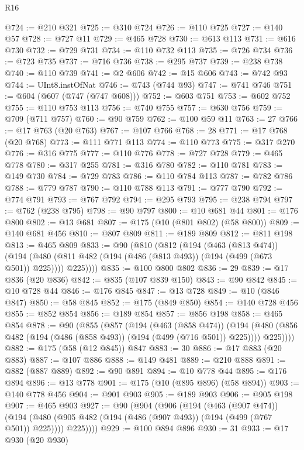 \begin{lexlean}{R16}
\begin{coremodule}
@724 := @210 @321
@725 := @310 @724
@726 := @110 @725
@727 := @140 @57
@728 := @727 @11
@729 := @465 @728
@730 := @613 @113
@731 := @616 @730
@732 := @729 @731
@734 := @110 @732 @113
@735 := @726 @734
@736 := @723 @735
@737 := @716 @736
@738 := @295 @737
@739 := @238 @738
@740 := @110 @739
@741 := @2 @606
@742 := @15 @606
@743 := @742 @93
@744 := UInt8.instOfNat
@746 := @743 (@744 @93)
@747 := @741 @746
@751 := @604 (@607 (@747 (@747 @608)))
@752 := @603 @751
@753 := @602 @752
@755 := @110 @753 @113
@756 := @740 @755
@757 := @630 @756
@759 := @709 (@711 @757)
@760 := @90 @759
@762 := @100 @59 @11
@763 := 27
@766 := @17 @763 (@20 @763)
@767 := @107 @766
@768 := 28
@771 := @17 @768 (@20 @768)
@773 := @111 @771 @113
@774 := @110 @773
@775 := @317 @270
@776 := @316 @775
@777 := @110 @776
@778 := @727 @728
@779 := @465 @778
@780 := @317 @255
@781 := @316 @780
@782 := @110 @781
@783 := @149 @730
@784 := @729 @783
@786 := @110 @784 @113
@787 := @782 @786
@788 := @779 @787
@790 := @110 @788 @113
@791 := @777 @790
@792 := @774 @791
@793 := @767 @792
@794 := @295 @793
@795 := @238 @794
@797 := @762 (@238 @795)
@798 := @90 @797
@800 := @10 @681 @44
@801 := @176 @800
@802 := @13 @681
@807 := @175 (@10 (@801 @802) (@58 @800))
@809 := @140 @681 @456
@810 := @807 @809
@811 := @189 @809
@812 := @811 @198
@813 := @465 @809
@833 := @90
    (@810
      (@812
        (@194
          (@463 (@813 @474))
          (@194 (@480 (@811 @482 (@194 (@486 (@813 @493)) (@194 (@499 (@673 @501)) @225)))) @225))))
@835 := @100 @800 @802
@836 := 29
@839 := @17 @836 (@20 @836)
@842 := @835 (@107 @839 @150)
@843 := @90 @842
@845 := @10 @728 @44
@846 := @176 @845
@847 := @13 @728
@849 := @10 (@846 @847)
@850 := @58 @845
@852 := @175 (@849 @850)
@854 := @140 @728 @456
@855 := @852 @854
@856 := @189 @854
@857 := @856 @198
@858 := @465 @854
@878 := @90
    (@855
      (@857
        (@194
          (@463 (@858 @474))
          (@194 (@480 (@856 @482 (@194 (@486 (@858 @493)) (@194 (@499 (@716 @501)) @225)))) @225))))
@882 := @175 (@58 (@12 @845)) @847
@883 := 30
@886 := @17 @883 (@20 @883)
@887 := @107 @886
@888 := @149 @481
@889 := @210 @888
@891 := @882 (@887 @889)
@892 := @90 @891
@894 := @10 @778 @44
@895 := @176 @894
@896 := @13 @778
@901 := @175 (@10 (@895 @896) (@58 @894))
@903 := @140 @778 @456
@904 := @901 @903
@905 := @189 @903
@906 := @905 @198
@907 := @465 @903
@927 := @90
    (@904
      (@906
        (@194
          (@463 (@907 @474))
          (@194 (@480 (@905 @482 (@194 (@486 (@907 @493)) (@194 (@499 (@767 @501)) @225)))) @225))))
@929 := @100 @894 @896
@930 := 31
@933 := @17 @930 (@20 @930)

\end{coremodule}
\end{lexlean}
